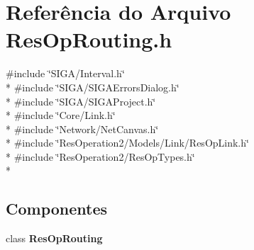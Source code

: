 \section{Referência do Arquivo Res\+Op\+Routing.\+h}
\label{_res_op_routing_8h}
{\ttfamily \#include \char`\"{}S\+I\+G\+A/\+Interval.\+h\char`\"{}}\\*
{\ttfamily \#include \char`\"{}S\+I\+G\+A/\+S\+I\+G\+A\+Errors\+Dialog.\+h\char`\"{}}\\*
{\ttfamily \#include \char`\"{}S\+I\+G\+A/\+S\+I\+G\+A\+Project.\+h\char`\"{}}\\*
{\ttfamily \#include \char`\"{}Core/\+Link.\+h\char`\"{}}\\*
{\ttfamily \#include \char`\"{}Network/\+Net\+Canvas.\+h\char`\"{}}\\*
{\ttfamily \#include \char`\"{}Res\+Operation2/\+Models/\+Link/\+Res\+Op\+Link.\+h\char`\"{}}\\*
{\ttfamily \#include \char`\"{}Res\+Operation2/\+Res\+Op\+Types.\+h\char`\"{}}\\*
\subsection*{Componentes}
\begin{DoxyCompactItemize}
\item 
class {\bf Res\+Op\+Routing}
\end{DoxyCompactItemize}
